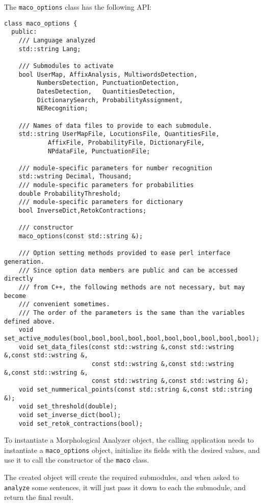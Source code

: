 \documentclass[a4paper]{book}
\begin{document}
\noindent The {\tt maco\_options} class has the following API:
\begin{verbatim}
class maco_options {
  public:
    /// Language analyzed
    std::string Lang;

    /// Submodules to activate
    bool UserMap, AffixAnalysis, MultiwordsDetection, 
         NumbersDetection, PunctuationDetection, 
         DatesDetection,   QuantitiesDetection, 
         DictionarySearch, ProbabilityAssignment,
         NERecognition;

    /// Names of data files to provide to each submodule.
    std::string UserMapFile, LocutionsFile, QuantitiesFile,
            AffixFile, ProbabilityFile, DictionaryFile, 
            NPdataFile, PunctuationFile;

    /// module-specific parameters for number recognition
    std::wstring Decimal, Thousand;
    /// module-specific parameters for probabilities
    double ProbabilityThreshold;
    /// module-specific parameters for dictionary
    bool InverseDict,RetokContractions;

    /// constructor
    maco_options(const std::string &); 

    /// Option setting methods provided to ease perl interface generation. 
    /// Since option data members are public and can be accessed directly
    /// from C++, the following methods are not necessary, but may become
    /// convenient sometimes.
    /// The order of the parameters is the same than the variables defined above.
    void set_active_modules(bool,bool,bool,bool,bool,bool,bool,bool,bool,bool);
    void set_data_files(const std::wstring &,const std::wstring &,const std::wstring &,
                        const std::wstring &,const std::wstring &,const std::wstring &,
                        const std::wstring &,const std::wstring &);
    void set_nummerical_points(const std::string &,const std::string &);
    void set_threshold(double);
    void set_inverse_dict(bool);
    void set_retok_contractions(bool);
\end{verbatim}

  To instantiate a Morphological Analyzer object, the calling
  application needs to instantiate a {\tt maco\_options} object,
  initialize its fields with the desired values, and use it to call
  the constructor of the {\tt maco} class.

  The created object will create the required submodules, and when
  asked to {\tt analyze} some sentences, it will just pass it down to
  each the submodule, and return the final result.
\end{document}
